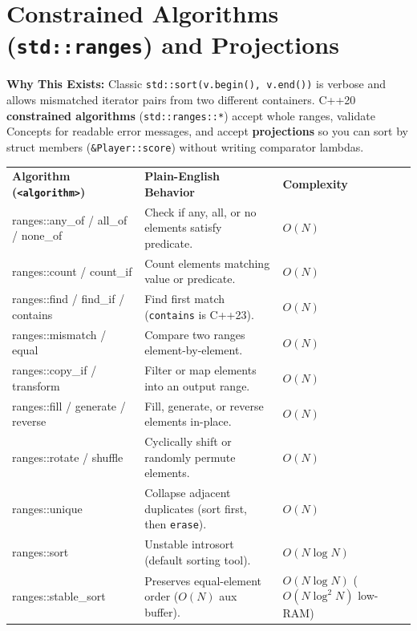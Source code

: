 \documentclass[11pt,a4paper]{article}
\newcommand{\whybeat}{\textbf{\color{accentteal}Why This Exists:} }
\begin{document}
\section{Constrained Algorithms (\texttt{std::ranges}) and Projections}

\whybeat Classic \texttt{std::sort(v.begin(), v.end())} is verbose and allows mismatched iterator pairs from two different containers. C++20 \textbf{constrained algorithms} (\texttt{std::ranges::*}) accept whole ranges, validate Concepts for readable error messages, and accept \textbf{projections} so you can sort by struct members (\texttt{\&Player::score}) without writing comparator lambdas.

\begingroup\footnotesize{}
\begin{xltabular}{\textwidth}{>{\raggedright\arraybackslash\ttfamily}p{4.3cm} >{\raggedright\arraybackslash}X >{\raggedright\arraybackslash}p{3.1cm}}
\toprule[1.1pt]
\textcolor{primaryblue}{\normalfont\bfseries Algorithm (\texttt{<algorithm>})} & \textcolor{primaryblue}{\textbf{Plain-English Behavior}} & \textcolor{primaryblue}{\textbf{Complexity}} \\
\midrule[0.6pt]
\endhead
{}\bottomrule[1.1pt]
\endfoot
ranges::any\_of / all\_of / none\_of & Check if any, all, or no elements satisfy predicate. & $O(N)$ \\
ranges::count / count\_if & Count elements matching value or predicate. & $O(N)$ \\
ranges::find / find\_if / contains & Find first match (\texttt{contains} is C++23). & $O(N)$ \\
ranges::mismatch / equal & Compare two ranges element-by-element. & $O(N)$ \\
ranges::copy\_if / transform & Filter or map elements into an output range. & $O(N)$ \\
ranges::fill / generate / reverse & Fill, generate, or reverse elements in-place. & $O(N)$ \\
ranges::rotate / shuffle & Cyclically shift or randomly permute elements. & $O(N)$ \\
ranges::unique & Collapse adjacent duplicates (sort first, then \texttt{erase}). & $O(N)$ \\
ranges::sort & Unstable introsort (default sorting tool). & $O(N \log N)$ \\
ranges::stable\_sort & Preserves equal-element order ($O(N)$ aux buffer). & $O(N \log N)$ ($O(N \log^2 N)$ low-RAM) \\

\end{xltabular}
\end{document}

